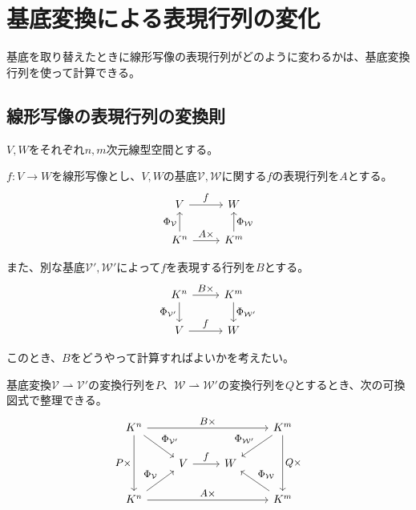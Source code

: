 \documentclass[../../../topic_linear-algebra]{subfiles}
\begin{document}
\sectionline
\section{基底変換による表現行列の変化}

基底を取り替えたときに線形写像の表現行列がどのように変わるかは、基底変換行列を使って計算できる。

\subsection{線形写像の表現行列の変換則}

$V, W$をそれぞれ$n,m$次元線型空間とする。

$f\colon V \to W$を線形写像とし、$V,W$の基底$\mathcal{V},\mathcal{W}$に関する$f$の表現行列を$A$とする。
\begin{equation*}
  \begin{tikzcd}[every label/.append style = {font = \small}]
    V \arrow[r,"f"] & W \\
    K^n \arrow[u,"{\Phi_{\mathcal{V}}}"] \arrow[r,"A\times"] & K^m \arrow[u,"{\Phi_{\mathcal{W}}}"']
  \end{tikzcd}
\end{equation*}

また、別な基底$\mathcal{V}', \mathcal{W}'$によって$f$を表現する行列を$B$とする。
\begin{equation*}
  \begin{tikzcd}[every label/.append style = {font = \small}]
    K^n \arrow[d,"{\Phi_{\mathcal{V}'}}"'] \arrow[r,"B\times"] & K^m \arrow[d,"{\Phi_{\mathcal{W}'}}"] \\
    V \arrow[r,"f"] & W
  \end{tikzcd}
\end{equation*}

\br

このとき、$B$をどうやって計算すればよいかを考えたい。

\br

基底変換$\mathcal{V} \rightharpoonup \mathcal{V}'$の変換行列を$P$、$\mathcal{W} \rightharpoonup \mathcal{W}'$の変換行列を$Q$とするとき、次の可換図式で整理できる。
\begin{equation*}
  \begin{tikzcd}[every label/.append style = {font = \small}]
    K^n \arrow[dd,"P\times"'] \arrow[rd,"{\Phi_{\mathcal{V}'}}"] \arrow[rrr,"B\times"] &&& K^m \arrow[dd,"Q\times"] \arrow[ld,"{\Phi_{\mathcal{W}'}}"'] \\
    & V \arrow[r,"f"] & W & \\
    K^n \arrow[ru,"{\Phi_{\mathcal{V}}}"] \arrow[rrr,"A\times"] &&& K^m \arrow[lu,"{\Phi_{\mathcal{W}}}"']
  \end{tikzcd}
\end{equation*}
\end{document}
